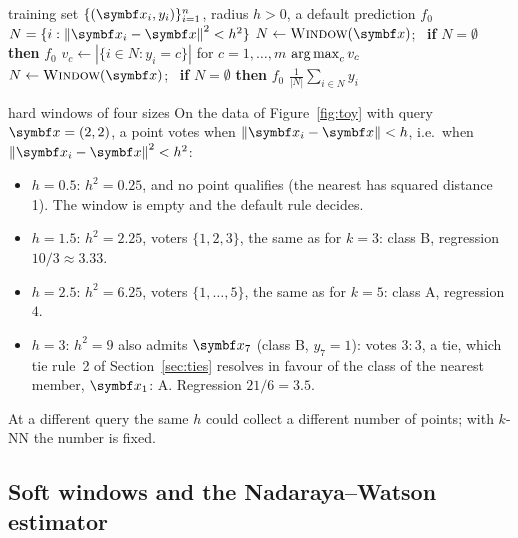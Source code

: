 \documentclass[11pt]{article}
\begin{document}
\begin{algorithm}[htbp]
\caption{Hard-window Parzen classifier and regressor}
\label{alg:hard}
\begin{algorithmic}[1]
\Require training set $\{(\x_i, y_i)\}_{i=1}^n$, radius $h > 0$, a default prediction $f_0$
  \State \Return $N = \{i : \norm{\x_i - \x}^2 < h^2\}$ 
\EndFunction
{}
  \State $N \gets \Call{Window}{\x}$; \ \textbf{if} $N = \emptyset$ \textbf{then} \Return $f_0$
  \State $v_c \gets |\{i \in N : y_i = c\}|$ for $c = 1, \dots, m$
  \State \Return $\operatorname*{arg\,max}_c v_c$ 
\EndFunction
{}
  \State $N \gets \Call{Window}{\x}$; \ \textbf{if} $N = \emptyset$ \textbf{then} \Return $f_0$
  \State \Return $\frac{1}{|N|} \sum_{i \in N} y_i$
\EndFunction
\end{algorithmic}
\end{algorithm}

\begin{worked}{hard windows of four sizes}
On the data of Figure~\ref{fig:toy} with query $\x = (2,2)$, a point votes when $\norm{\x_i - \x} < h$, i.e.\ when
$\norm{\x_i - \x}^2 < h^2$:
\begin{itemize}
\item $h = 0.5$: $h^2 = 0.25$, and no point qualifies (the nearest has squared distance 1). The window is empty and
the default rule decides.
\item $h = 1.5$: $h^2 = 2.25$, voters $\{1, 2, 3\}$, the same as for $k = 3$: class B, regression $10/3 \approx 3.33$.
\item $h = 2.5$: $h^2 = 6.25$, voters $\{1, \dots, 5\}$, the same as for $k = 5$: class A, regression $4$.
\item $h = 3$: $h^2 = 9$ also admits $\x_7$ (class B, $y_7 = 1$): votes $3:3$, a tie, which tie rule~2 of
Section~\ref{sec:ties} resolves in favour of the class of the nearest member, $\x_1$: A. Regression $21/6 = 3.5$.
\end{itemize}
At a different query the same $h$ could collect a different number of points; with $k$-NN the number is fixed.
\end{worked}


\subsection{Soft windows and the Nadaraya--Watson estimator}\label{sec:soft}
\end{document}
